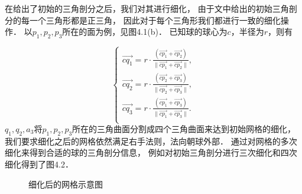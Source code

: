 在给出了初始的三角剖分之后，我们对其进行细化，
由于文中给出的初始三角剖分的每一个三角形都是正三角，
因此对于每个三角形我们都进行一致的细化操作．
以$p_1, p_2, p_3$所在的面为例，见图4.1(b)．
已知球的球心为$c$，半径为$r$，则有

\begin{equation}
\left\{
\begin{array}{r}
\vec{cq_1}=r\cdot\frac{(\vec{cp_1}+\vec{cp_2})}{\|\vec{cp_1}+\vec{cp_2}\|},\\[0.2cm]
\vec{cq_2}=r\cdot\frac{(\vec{cp_2}+\vec{cp_3})}{\|\vec{cp_2}+\vec{cp_3}\|},\\[0.2cm]
\vec{cq_3}=r\cdot\frac{(\vec{cp_1}+\vec{cp_3})}{\|\vec{cp_1}+\vec{cp_3}\|}.\\[0.2cm]
\end{array}\right.
\end{equation}
$q_1, q_2, a_3$将$p_1, p_2, p_3$所在的三角曲面分割成四个三角曲面来达到初始网格的细化，
我们要求细化之后的网格依然满足右手法则，法向朝球外部．
通过对网格的多次细化来得到合适的球的三角剖分信息，
例如对初始三角剖分进行三次细化和四次细化得到了图4.2．

\begin{figure}[htb]
	\label{fig:refine}
	\centering
	\hfill
	\caption{细化后的网格示意图}
\end{figure}


